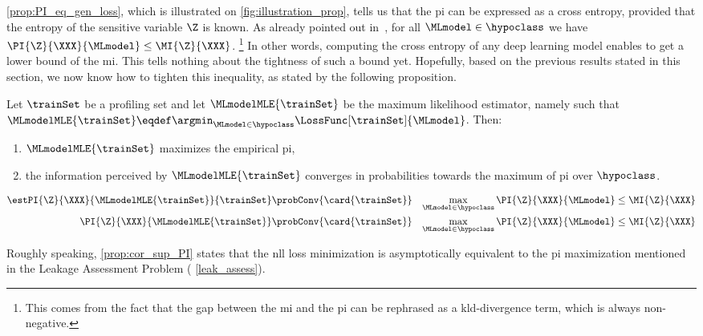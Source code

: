 \autoref{prop:PI_eq_gen_loss}, which is illustrated on \autoref{fig:illustration_prop}, tells us that the \gls{pi} can be expressed as a cross entropy, provided that the entropy of the sensitive variable \(\Z\) is known. 
As already pointed out in~\cite[Thm.~6]{bronchain_leakage_2019}, for all \(\MLmodel \in \hypoclass\) we have \(\PI{\Z}{\XXX}{\MLmodel} \leq \MI{\Z}{\XXX}\).%
\footnote{
    This comes from the fact that the gap between the \gls{mi} and the \gls{pi} can be rephrased as a \gls{kld}-divergence term, which is always non-negative.
}
In other words, computing the cross entropy of any deep learning model enables to get a lower bound of the \gls{mi}. 
This tells nothing about the tightness of such a bound yet.
Hopefully, based on the previous results stated in this section, we now know how to tighten this inequality, as stated by the following proposition.
\begin{proposition}
    \label{prop:cor_sup_PI}
    Let \(\trainSet\) be a profiling set and let \(\MLmodelMLE{\trainSet}\) be the maximum likelihood estimator, namely such that \(\MLmodelMLE{\trainSet} \eqdef \argmin_{\MLmodel \in \hypoclass} \LossFunc[\trainSet]{\MLmodel}\). 
    Then: 
    \begin{enumerate}
        \item \(\MLmodelMLE{\trainSet}\) maximizes the empirical \gls{pi},
        \item  the information perceived by \(\MLmodelMLE{\trainSet}\) converges in probabilities towards the maximum of \gls{pi} over \(\hypoclass\).
    \end{enumerate}
    \begin{eqnarray}
        \label{eq:sup_ePI}
        \estPI{\Z}{\XXX}{\MLmodelMLE{\trainSet}}{\trainSet} 
        & \probConv{\card{\trainSet}} & 
        \max_{\MLmodel \in \hypoclass} \PI{\Z}{\XXX}{\MLmodel} 
        \leq \MI{\Z}{\XXX}\\
        \label{eq:sup_PI}
        \PI{\Z}{\XXX}{\MLmodelMLE{\trainSet}} & \probConv{\card{\trainSet}} &
        \max_{\MLmodel \in \hypoclass} \PI{\Z}{\XXX}{\MLmodel} 
        \leq \MI{\Z}{\XXX}
    \end{eqnarray}
\end{proposition}
Roughly speaking, \autoref{prop:cor_sup_PI} states that  the \gls{nll} loss minimization is asymptotically equivalent to the \gls{pi} maximization mentioned in the Leakage Assessment Problem (\ie{} \autoref{leak_assess}).
